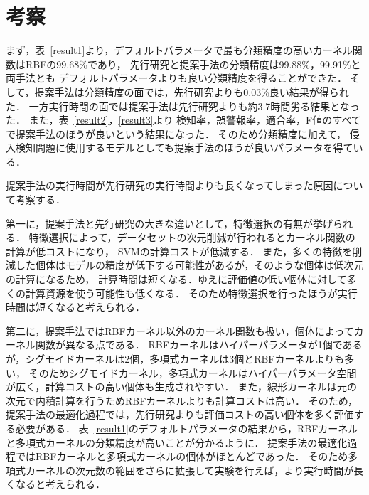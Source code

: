 \section{考察}
まず，表~\ref{result1}より，デフォルトパラメータで最も分類精度の高いカーネル関数はRBFの99.68\%であり，
先行研究と提案手法の分類精度は99.88\%，99.91\%と両手法とも
デフォルトパラメータよりも良い分類精度を得ることができた．
そして，提案手法は分類精度の面では，先行研究よりも0.03\%良い結果が得られた．
一方実行時間の面では提案手法は先行研究よりも約3.7時間劣る結果となった．
また，表~\ref{result2}，\ref{result3}より
検知率，誤警報率，適合率，F値のすべてで提案手法のほうが良いという結果になった．
そのため分類精度に加えて，
侵入検知問題に使用するモデルとしても提案手法のほうが良いパラメータを得ている．

提案手法の実行時間が先行研究の実行時間よりも長くなってしまった原因について考察する．

第一に，提案手法と先行研究の大きな違いとして，特徴選択の有無が挙げられる．
特徴選択によって，データセットの次元削減が行われるとカーネル関数の計算が低コストになり，
SVMの計算コストが低減する．
また，多くの特徴を削減した個体はモデルの精度が低下する可能性があるが，そのような個体は低次元の計算になるため，
計算時間は短くなる．ゆえに評価値の低い個体に対して多くの計算資源を使う可能性も低くなる．
そのため特徴選択を行ったほうが実行時間は短くなると考えられる．

第二に，提案手法ではRBFカーネル以外のカーネル関数も扱い，個体によってカーネル関数が異なる点である．
RBFカーネルはハイパーパラメータが1個であるが，シグモイドカーネルは2個，多項式カーネルは3個とRBFカーネルよりも多い，
そのためシグモイドカーネル，多項式カーネルはハイパーパラメータ空間が広く，計算コストの高い個体も生成されやすい．
また，線形カーネルは元の次元で内積計算を行うためRBFカーネルよりも計算コストは高い．
そのため，提案手法の最適化過程では，先行研究よりも評価コストの高い個体を多く評価する必要がある．
表~\ref{result1}のデフォルトパラメータの結果から，RBFカーネルと多項式カーネルの分類精度が高いことが分かるように．
提案手法の最適化過程ではRBFカーネルと多項式カーネルの個体がほとんどであった．
そのため多項式カーネルの次元数の範囲をさらに拡張して実験を行えば，より実行時間が長くなると考えられる．

